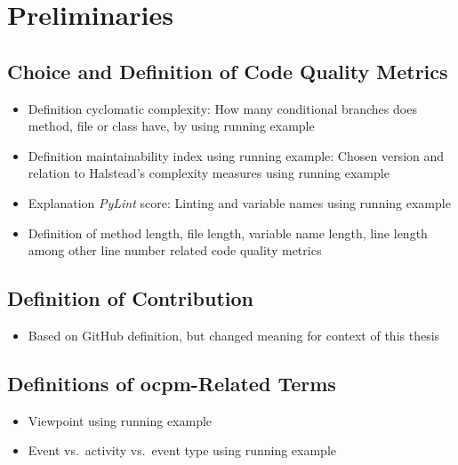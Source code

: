\chapter{Preliminaries}
\label{chap:prelim}

\section{Choice and Definition of Code Quality Metrics}
\begin{itemize}
	\item Definition cyclomatic complexity: How many conditional branches does method, file or class have, by using running example
	\item Definition maintainability index using running example: Chosen version and relation to Halstead's complexity measures using running example
	\item Explanation \emph{PyLint} score: Linting and variable names using running example
	\item Definition of method length, file length, variable name length, line length among other line number related code quality metrics
\end{itemize}

\section{Definition of Contribution}
\begin{itemize}
	\item Based on GitHub definition, but changed meaning for context of this thesis
\end{itemize}

\section{Definitions of \ac{ocpm}-Related Terms}
\begin{itemize}
	\item Viewpoint using running example
	\item Event vs.\ activity vs.\ event type using running example
\end{itemize}